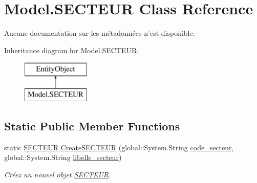 \hypertarget{class_model_1_1_s_e_c_t_e_u_r}{\section{Model.\-S\-E\-C\-T\-E\-U\-R Class Reference}
\label{class_model_1_1_s_e_c_t_e_u_r}
}


Aucune documentation sur les métadonnées n'est disponible.  


Inheritance diagram for Model.\-S\-E\-C\-T\-E\-U\-R\-:\begin{figure}[H]
\begin{center}
\leavevmode
\includegraphics[height=2.000000cm]{class_model_1_1_s_e_c_t_e_u_r}
\end{center}
\end{figure}
\subsection*{Static Public Member Functions}
\begin{DoxyCompactItemize}
\item 
static \hyperlink{class_model_1_1_s_e_c_t_e_u_r}{S\-E\-C\-T\-E\-U\-R} \hyperlink{class_model_1_1_s_e_c_t_e_u_r_a05f46909f4d42aa7093230a5bec5c6b4}{Create\-S\-E\-C\-T\-E\-U\-R} (global\-::\-System.\-String \hyperlink{class_model_1_1_s_e_c_t_e_u_r_a08444aca8045d7e1ce29ad2d8760807d}{code\-\_\-secteur}, global\-::\-System.\-String \hyperlink{class_model_1_1_s_e_c_t_e_u_r_acd43f9e6cd67fd6018645b7c944fcf40}{libelle\-\_\-secteur})
\begin{DoxyCompactList}\small\item\em Créez un nouvel objet \hyperlink{class_model_1_1_s_e_c_t_e_u_r}{S\-E\-C\-T\-E\-U\-R}. \end{DoxyCompactList}\end{DoxyCompactItemize}
